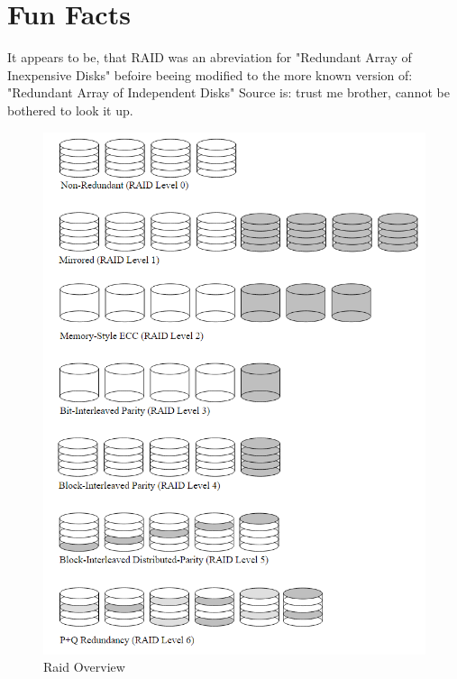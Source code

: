 \documentclass{article}
\begin{document}
\section*{Fun Facts}
It appears to be, that RAID was an abreviation for "Redundant Array of Inexpensive Disks" befoire beeing
modified to the more known version of: "Redundant Array of Independent Disks"
Source is: trust me brother, cannot be bothered to look it up.
\listoffigures
\listoftables


\begin{figure}[h]
    \label{fig:raid-overview}
    \includegraphics[width=\textwidth]{raid-overview}
    \caption{Raid Overview \cite{cmu:raidhighperf}}
\end{figure}
\end{document}
